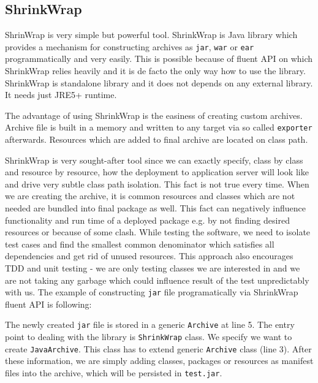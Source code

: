 \documentclass[12pt,final,oneside]{fithesis}
\begin{document}
		\subsection{ShrinkWrap}

ShrinWrap is very simple but powerful tool. ShrinkWrap is Java library which provides a mechanism for constructing  archives as \texttt{jar}, \texttt{war} or \texttt{ear} programmatically and very easily. This is possible because of fluent API on which ShrinkWrap relies heavily and it is de facto the only way how to use the library. ShrinkWrap is standalone library and it does not depends on any external library. It needs just JRE5+ runtime.

The advantage of using ShrinkWrap is the easiness of creating custom archives. Archive file is built in a memory and written to any target via so called \texttt{exporter} afterwards. Resources which are added to final archive are located on class path.

ShrinkWrap is very sought-after tool since we can exactly specify, class by class and resource by resource, how the deployment to application server will look like and drive very subtle class path isolation. This fact is not true every time. When we are creating the archive, it is common resources and classes which are not needed are bundled into final package as well. This fact can negatively influence functionality and run time of a deployed package e.g. by not finding desired resources or because of some clash. While testing the software, we need to isolate test cases and find the smallest common denominator which satisfies all dependencies and get rid of unused resources. This approach also encourages TDD and unit testing - we are only testing classes we are interested in and we are not taking any garbage which could influence result of the test unpredictably with us. The example of constructing \texttt{jar} file programatically via ShrinkWrap fluent API is following: 



The newly created \texttt{jar} file is stored in a generic \texttt{Archive} at line 5. The entry point to dealing with the library is \texttt{ShrinkWrap} class. We specify we want to create \texttt{JavaArchive}. This class has to extend generic \texttt{Archive} class (line 3). After these information, we are simply adding classes, packages or resources as manifest files into the archive, which will be persisted in \texttt{test.jar}.
\end{document}
